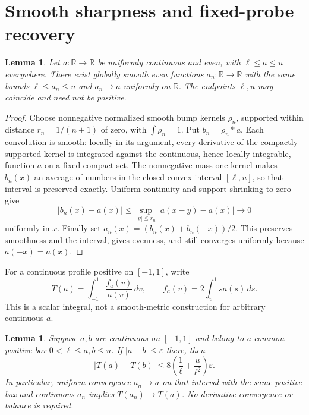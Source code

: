 \documentclass[11pt]{article}
\newtheorem{lemma}[theorem]{Lemma}
\newcommand{\R}{\mathbb R}
\begin{document}
\section{Smooth sharpness and fixed-probe recovery}

\begin{lemma}\label{lem:even-smooth-box-approximation}
Let $a:\R\to\R$ be uniformly continuous and even, with
$\ell\leq a\leq u$ everywhere. There exist globally smooth even functions
$a_n:\R\to\R$ with the same bounds $\ell\leq a_n\leq u$ and
$a_n\to a$ uniformly on $\R$. The endpoints $\ell,u$ may coincide and need
not be positive.
\end{lemma}

\begin{proof}
Choose nonnegative normalized smooth bump kernels $\rho_n$, supported within
distance $r_n=1/(n+1)$ of zero, with $\int\rho_n=1$. Put
$b_n=\rho_n*a$. Each convolution is smooth: locally in its argument, every
derivative of the compactly supported kernel is integrated against the
continuous, hence locally integrable, function $a$ on a fixed compact set.
The nonnegative mass-one kernel makes $b_n(x)$ an average of numbers in the
closed convex interval $[\ell,u]$, so that interval is preserved exactly.
Uniform continuity and support shrinking to zero give
\[
 |b_n(x)-a(x)|
 \leq\sup_{|y|\leq r_n}|a(x-y)-a(x)|\longrightarrow0
\]
uniformly in $x$. Finally set $a_n(x)=(b_n(x)+b_n(-x))/2$.
This preserves smoothness and the interval, gives evenness, and still
converges uniformly because $a(-x)=a(x)$.
\end{proof}

For a continuous profile positive on $[-1,1]$, write
\[
 T(a)=\int_{-1}^1\frac{f_a(v)}{a(v)}\,dv,\qquad
 f_a(v)=2\int_v^1s a(s)\,ds .
\]
This is a scalar integral, not a smooth-metric construction for arbitrary
continuous $a$.

\begin{lemma}\label{lem:constant-probe-continuity}
Suppose $a,b$ are continuous on $[-1,1]$ and belong to a common positive box
$0<\ell\leq a,b\leq u$. If $|a-b|\leq\varepsilon$ there, then
\begin{equation}\label{eq:warp-ratio-lipschitz}
 |T(a)-T(b)|\leq
 8\left(\frac1\ell+\frac{u}{\ell^2}\right)\varepsilon .
\end{equation}
In particular, uniform convergence $a_n\to a$ on that interval with the same
positive box and continuous $a_n$ implies $T(a_n)\to T(a)$.
No derivative convergence or balance is required.
\end{lemma}
\end{document}
